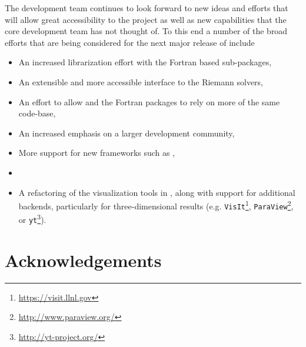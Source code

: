 The \clawpack development team continues to look forward to new ideas and
efforts that will allow great accessibility to the project as well as new
capabilities that the core development team has not thought of.  To this end a
number of the broad efforts that are being considered for the next major release
of \clawpack include
\begin{itemize}
    \item An increased librarization effort with the Fortran based sub-packages,
    \item An extensible and more accessible interface to the Riemann solvers,
    \item An effort to allow \pyclaw and the \clawpack Fortran packages to rely
    on more of the same code-base,
    \item An increased emphasis on a larger development community,
    \item More support for new frameworks such as \forestclaw \cite{Burstedde:we},
    \item {}
    \item A refactoring of the visualization tools in \visclaw, along with
    support for additional backends, particularly for three-dimensional results
    (e.g.
\texttt{VisIt}\footnote{\url{https://visit.llnl.gov}}, 
\texttt{ParaView}\footnote{\url{http://www.paraview.org/}}, or 
\texttt{yt}\footnote{\url{http://yt-project.org/}}).
\end{itemize}

\section*{Acknowledgements}


